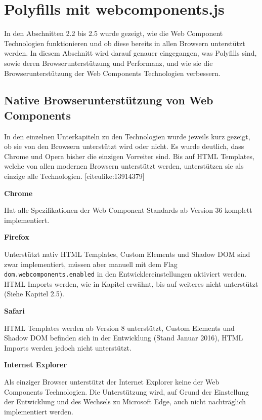 \section{Polyfills mit
webcomponents.js}\label{polyfills-mit-webcomponents.js}

In den Abschnitten 2.2 bis 2.5 wurde gezeigt, wie die Web Component
Technologien funktionieren und ob diese bereits in allen Browsern
unterstützt werden. In diesem Abschnitt wird darauf genauer eingegangen,
was Polyfills sind, sowie deren Browserunterstützung und Performanz, und
wie sie die Browserunterstützung der Web Components Technologien
verbessern.

\subsection{Native Browserunterstützung von Web
Components}\label{native-browserunterstuxfctzung-von-web-components}

In den einzelnen Unterkapiteln zu den Technologien wurde jeweils kurz
gezeigt, ob sie von den Browsern unterstützt wird oder nicht. Es wurde
deutlich, dass Chrome und Opera bisher die einzigen Vorreiter sind. Bis
auf HTML Templates, welche von allen modernen Browsern unterstützt
werden, unterstützen sie als einzige alle Technologien.
{[}citeulike:13914379{]}

\textbf{Chrome}

Hat alle Spezifikationen der Web Component Standards ab Version 36
komplett implementiert.

\textbf{Firefox}

Unterstützt nativ HTML Templates, Custom Elements und Shadow DOM sind
zwar implementiert, müssen aber manuell mit dem Flag
\texttt{dom.webcomponents.enabled} in den Entwicklereinstellungen
aktiviert werden. HTML Imports werden, wie in Kapitel erwähnt, bis auf
weiteres nicht unterstützt (Siehe Kapitel 2.5).

\textbf{Safari}

HTML Templates werden ab Version 8 unterstützt, Custom Elements und
Shadow DOM befinden sich in der Entwicklung (Stand Januar 2016), HTML
Imports werden jedoch nicht unterstützt.

\textbf{Internet Explorer}

Als einziger Browser unterstützt der Internet Explorer keine der Web
Components Technologien. Die Unterstützung wird, auf Grund der
Einstellung der Entwicklung und des Wechsels zu Microsoft Edge, auch
nicht nachträglich implementiert werden.

